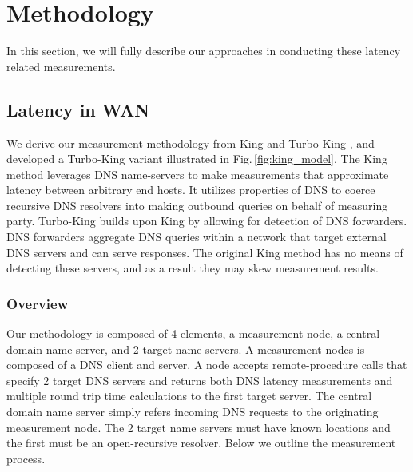 
\section{Methodology}
\label{sec:methodology}
In this section, we will fully describe our approaches in conducting these latency related measurements.

\subsection{Latency in WAN}
\label{sec:latency-wan}

We derive our measurement methodology from King \cite{gummadi2002king} and Turbo-King \cite{leonard2008turbo}, and developed a Turbo-King variant illustrated in Fig.\,\ref{fig:king_model}. The King method leverages DNS name-servers to make measurements that approximate latency between arbitrary end hosts. It utilizes properties of DNS to coerce recursive DNS resolvers into making outbound queries on behalf of measuring party. Turbo-King builds upon King by allowing for detection of DNS forwarders. DNS forwarders aggregate DNS queries within a network that target external DNS servers and can serve responses. The original King method has no means of detecting these servers, and as a result they may skew measurement results.

\subsubsection{Overview}
Our methodology is composed of 4 elements, a measurement node, a central domain name server, and 2 target name servers. A measurement nodes is composed of a DNS client and server. A node accepts remote-procedure calls that specify 2 target DNS servers and returns both DNS latency measurements and multiple round trip time calculations to the first target server. The central domain name server simply refers incoming DNS requests to the originating measurement node. The 2 target name servers must have known locations and the first must be an open-recursive resolver. Below we outline the measurement process.

